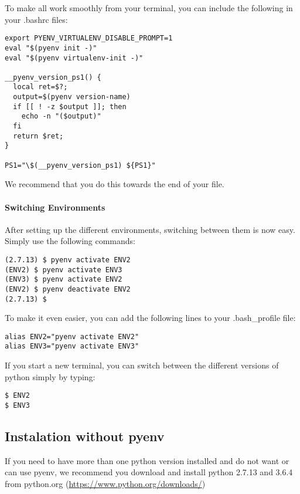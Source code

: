 To make all work smoothly from your terminal, you can include the
following in your .bashrc files:

\begin{verbatim}
export PYENV_VIRTUALENV_DISABLE_PROMPT=1
eval "$(pyenv init -)"
eval "$(pyenv virtualenv-init -)"

__pyenv_version_ps1() {
  local ret=$?;
  output=$(pyenv version-name)
  if [[ ! -z $output ]]; then
    echo -n "($output)"
  fi
  return $ret;
}

PS1="\$(__pyenv_version_ps1) ${PS1}"
\end{verbatim}

We recommend that you do this towards the end of your file.

\paragraph{Switching Environments}\label{switching-environments}

After setting up the different environments, switching between them is
now easy. Simply use the following commands:

\begin{verbatim}
(2.7.13) $ pyenv activate ENV2
(ENV2) $ pyenv activate ENV3
(ENV3) $ pyenv activate ENV2
(ENV2) $ pyenv deactivate ENV2
(2.7.13) $ 
\end{verbatim}

To make it even easier, you can add the following lines to your
.bash\_profile file:

\begin{verbatim}
alias ENV2="pyenv activate ENV2"
alias ENV3="pyenv activate ENV3"
\end{verbatim}

If you start a new terminal, you can switch between the different
versions of python simply by typing:

\begin{verbatim}
$ ENV2
$ ENV3
\end{verbatim}

\subsection{Instalation without
pyenv}\label{instalation-without-pyenv-1}

If you need to have more than one python version installed and do not
want or can use pyenv, we recommend you download and install python
2.7.13 and 3.6.4 from python.org
(\url{https://www.python.org/downloads/})

